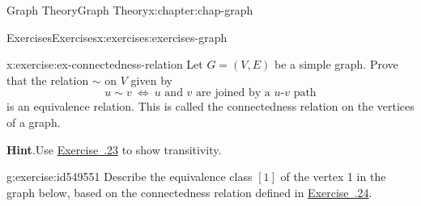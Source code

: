 \documentclass[oneside,10pt,]{book}
\newcommand{\blocktitlefont}{\relax}
\newcommand{\xreffont}{\relax}
\numberwithin{equation}{section}
\begin{document}
\begin{chapterptx}{Graph Theory}{}{Graph Theory}{}{}{x:chapter:chap-graph}
\begin{exercises-section}{Exercises}{}{Exercises}{}{}{x:exercises:exercises-graph}
\begin{divisionexercise}{24}{}{}{x:exercise:ex-connectedness-relation}
Let \(G = (V,E)\) be a simple graph. Prove that the relation \(\sim\) on \(V\) given by%
\begin{equation*}
u \sim v \ \Leftrightarrow \ \text{$u$ and $v$ are joined by a $u$-$v$ path}
\end{equation*}
is an equivalence relation. This is called the connectedness relation on the vertices of a graph.%
\par\smallskip%
\noindent\textbf{\blocktitlefont Hint}.\hypertarget{g:hint:id549570}{}\quad{}Use \hyperlink{x:exercise:ex-path-transitive}{Exercise~{\xreffont 5.8.23}} to show transitivity.%
\end{divisionexercise}%
\begin{divisionexercise}{25}{}{}{g:exercise:id549551}%
Describe the equivalence class \([1]\) of the vertex 1 in the graph below, based on the connectedness relation defined in \hyperlink{x:exercise:ex-connectedness-relation}{Exercise~{\xreffont 5.8.24}}.%
\begin{sidebyside}{1}{0.38}{0.38}{0}%
\begin{sbspanel}{0.24}%
\end{sbspanel}
\end{sidebyside}
\end{divisionexercise}
\end{exercises-section}
\end{chapterptx}
\end{document}
